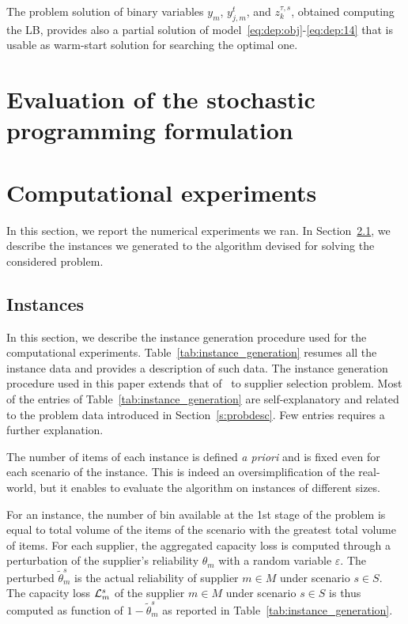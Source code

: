 \documentclass[a4paper,11pt]{article}
\begin{document}
	The problem solution of binary variables $ y_m$, $ y_{j,m}^t$, and $ z_k^{\tau,s}$, obtained computing the LB, provides also a partial solution of model~\eqref{eq:dep:obj}-\eqref{eq:dep:14} that is usable as warm-start solution for searching the optimal one.
	
	\section{Evaluation of the stochastic programming formulation}
	
	\section{Computational experiments}\label{s:nexp}
	In this section, we report the numerical experiments we ran.
	In Section~\ref{ss:instances}, we describe the instances we generated to the algorithm devised for solving the considered problem.
	
	\subsection{Instances}\label{ss:instances}
	In this section, we describe the instance generation procedure used for the computational experiments.
	Table~\ref{tab:instance_generation} resumes all the instance data and provides a description of such data.
	The instance generation procedure used in this paper extends that of~\cite{crainic2024capacity} to supplier selection problem.
	Most of the entries of Table~\ref{tab:instance_generation} are self-explanatory and related to the problem data introduced in Section~\ref{s:probdesc}.
	Few entries requires a further explanation.
	
	The number of items of each instance is defined \textit{a priori} and is fixed even for each scenario of the instance.
	This is indeed an oversimplification of the real-world, but it enables to evaluate the algorithm on instances of different sizes.
	
	For an instance, the number of bin available at the 1st stage of the problem is equal to total volume of the items of the scenario with the greatest total volume of items.
	For each supplier, the aggregated capacity loss is computed through a perturbation of the supplier's reliability $ \theta_m$ with a random variable $ \varepsilon$.
	The perturbed $ \tilde{\theta}^s_m$ is the actual reliability of supplier $ m \in M$ under scenario $s \in S$.
	The capacity loss $ {\cal L}^s_m$ of the supplier $ m \in M$ under scenario $s \in S$ is thus computed as function of $1 - \tilde{\theta}^s_m$ as reported in Table~\ref{tab:instance_generation}.
	
\end{document}
